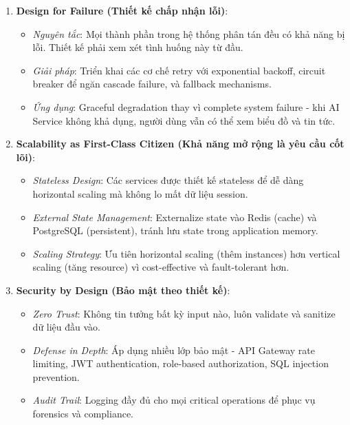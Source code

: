 \begin{enumerate}
    \item \textbf{Design for Failure (Thiết kế chấp nhận lỗi)}:
    \begin{itemize}
        \item \textit{Nguyên tắc}: Mọi thành phần trong hệ thống phân tán đều có khả năng bị lỗi. Thiết kế phải xem xét tình huống này từ đầu.
        \item \textit{Giải pháp}: Triển khai các cơ chế retry với exponential backoff, circuit breaker để ngăn cascade failure, và fallback mechanisms.
        \item \textit{Ứng dụng}: Graceful degradation thay vì complete system failure - khi AI Service không khả dụng, người dùng vẫn có thể xem biểu đồ và tin tức.
    \end{itemize}
    
    \item \textbf{Scalability as First-Class Citizen (Khả năng mở rộng là yêu cầu cốt lõi)}:
    \begin{itemize}
        \item \textit{Stateless Design}: Các services được thiết kế stateless để dễ dàng horizontal scaling mà không lo mất dữ liệu session.
        \item \textit{External State Management}: Externalize state vào Redis (cache) và PostgreSQL (persistent), tránh lưu state trong application memory.
        \item \textit{Scaling Strategy}: Ưu tiên horizontal scaling (thêm instances) hơn vertical scaling (tăng resource) vì cost-effective và fault-tolerant hơn.
    \end{itemize}
    
    \item \textbf{Security by Design (Bảo mật theo thiết kế)}:
    \begin{itemize}
        \item \textit{Zero Trust}: Không tin tưởng bất kỳ input nào, luôn validate và sanitize dữ liệu đầu vào.
        \item \textit{Defense in Depth}: Áp dụng nhiều lớp bảo mật - API Gateway rate limiting, JWT authentication, role-based authorization, SQL injection prevention.
        \item \textit{Audit Trail}: Logging đầy đủ cho mọi critical operations để phục vụ forensics và compliance.
    \end{itemize}
    

\end{enumerate}

